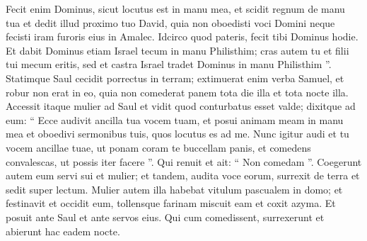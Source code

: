 \begin{biblechapter}
\begin{biblechapter}
\begin{biblechapter}
\begin{biblechapter}
\begin{biblechapter}
\begin{biblechapter}
\begin{biblechapter}
\begin{biblechapter}
\begin{biblechapter}
\begin{biblechapter}
\begin{biblechapter}
\begin{biblechapter}
\begin{biblechapter}
\begin{biblechapter}
\begin{biblechapter}
\begin{biblechapter}
\begin{biblechapter}
\begin{biblechapter}
\begin{biblechapter}
\begin{biblechapter}
\begin{biblechapter}
\begin{biblechapter}
\begin{biblechapter}
\begin{biblechapter}
\begin{biblechapter}
\begin{biblechapter}
\begin{biblechapter}
\begin{biblechapter}
 \verse Fecit enim Dominus, sicut locutus est in manu mea, et scidit regnum de manu tua et dedit illud proximo tuo David, 
\verse quia non oboedisti voci Domini neque fecisti iram furoris eius in Amalec. Idcirco quod pateris, fecit tibi Dominus hodie. 
\verse Et dabit Dominus etiam Israel tecum in manu Philisthim; cras autem tu et filii tui mecum eritis, sed et castra Israel tradet Dominus in manu Philisthim ”.
 \verse Statimque Saul cecidit porrectus in terram; extimuerat enim verba Samuel, et robur non erat in eo, quia non comederat panem tota die illa et tota nocte illa. 
\verse Accessit itaque mulier ad Saul et vidit quod conturbatus esset valde; dixitque ad eum: “ Ecce audivit ancilla tua vocem tuam, et posui animam meam in manu mea et oboedivi sermonibus tuis, quos locutus es ad me. 
\verse Nunc igitur audi et tu vocem ancillae tuae, ut ponam coram te buccellam panis, et comedens convalescas, ut possis iter facere ”. 
\verse Qui renuit et ait: “ Non comedam ”. Coegerunt autem eum servi sui et mulier; et tandem, audita voce eorum, surrexit de terra et sedit super lectum. 
\verse Mulier autem illa habebat vitulum pascualem in domo; et festinavit et occidit eum, tollensque farinam miscuit eam et coxit azyma. 
\verse Et posuit ante Saul et ante servos eius. Qui cum comedissent, surrexerunt et abierunt hac eadem nocte.
 

\end{biblechapter}
\end{biblechapter}
\end{biblechapter}
\end{biblechapter}
\end{biblechapter}
\end{biblechapter}
\end{biblechapter}
\end{biblechapter}
\end{biblechapter}
\end{biblechapter}
\end{biblechapter}
\end{biblechapter}
\end{biblechapter}
\end{biblechapter}
\end{biblechapter}
\end{biblechapter}
\end{biblechapter}
\end{biblechapter}
\end{biblechapter}
\end{biblechapter}
\end{biblechapter}
\end{biblechapter}
\end{biblechapter}
\end{biblechapter}
\end{biblechapter}
\end{biblechapter}
\end{biblechapter}
\end{biblechapter}
